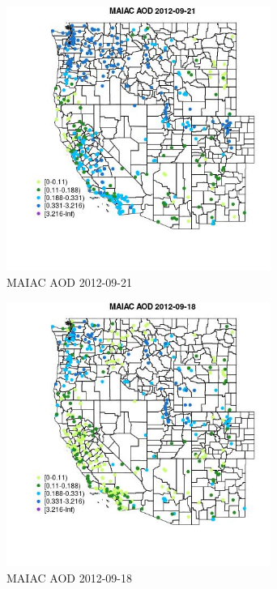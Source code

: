 \begin{figure} 
\centering  
\includegraphics[width=0.77\textwidth]{Code_Outputs/Report_ML_input_PM25_Step4_part_e_de_duplicated_aves_compiled_2019-05-14wNAs_MapObsMAIAC_AOD2012-09-21.jpg} 
\caption{\label{fig:Report_ML_input_PM25_Step4_part_e_de_duplicated_aves_compiled_2019-05-14wNAsMapObsMAIAC_AOD2012-09-21}MAIAC AOD 2012-09-21} 
\end{figure} 
 

\begin{figure} 
\centering  
\includegraphics[width=0.77\textwidth]{Code_Outputs/Report_ML_input_PM25_Step4_part_e_de_duplicated_aves_compiled_2019-05-14wNAs_MapObsMAIAC_AOD2012-09-18.jpg} 
\caption{\label{fig:Report_ML_input_PM25_Step4_part_e_de_duplicated_aves_compiled_2019-05-14wNAsMapObsMAIAC_AOD2012-09-18}MAIAC AOD 2012-09-18} 
\end{figure} 
 

